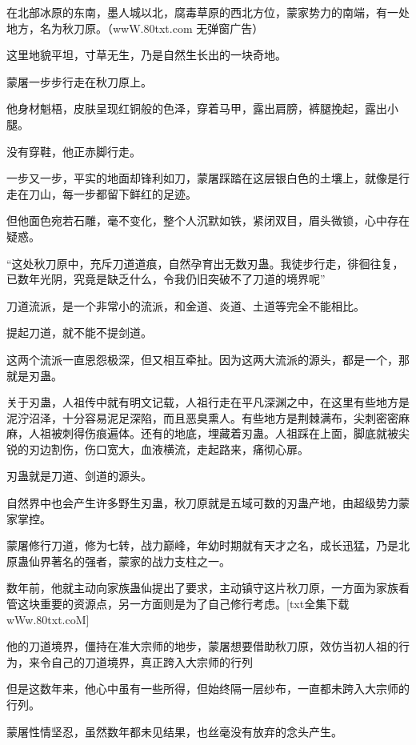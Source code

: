 
\begin{this_body}

在北部冰原的东南，墨人城以北，腐毒草原的西北方位，蒙家势力的南端，有一处地方，名为秋刀原。（wwW.80txt.com 无弹窗广告）

这里地貌平坦，寸草无生，乃是自然生长出的一块奇地。

蒙屠一步步行走在秋刀原上。

他身材魁梧，皮肤呈现红铜般的色泽，穿着马甲，露出肩膀，裤腿挽起，露出小腿。

没有穿鞋，他正赤脚行走。

一步又一步，平实的地面却锋利如刀，蒙屠踩踏在这层银白色的土壤上，就像是行走在刀山，每一步都留下鲜红的足迹。

但他面色宛若石雕，毫不变化，整个人沉默如铁，紧闭双目，眉头微锁，心中存在疑惑。

“这处秋刀原中，充斥刀道道痕，自然孕育出无数刃蛊。我徒步行走，徘徊往复，已数年光阴，究竟是缺乏什么，令我仍旧突破不了刀道的境界呢”

刀道流派，是一个非常小的流派，和金道、炎道、土道等完全不能相比。

提起刀道，就不能不提剑道。

这两个流派一直恩怨极深，但又相互牵扯。因为这两大流派的源头，都是一个，那就是刃蛊。

关于刃蛊，人祖传中就有明文记载，人祖行走在平凡深渊之中，在这里有些地方是泥泞沼泽，十分容易泥足深陷，而且恶臭熏人。有些地方是荆棘满布，尖刺密密麻麻，人祖被刺得伤痕遍体。还有的地底，埋藏着刃蛊。人祖踩在上面，脚底就被尖锐的刃边割伤，伤口宽大，血液横流，走起路来，痛彻心扉。

刃蛊就是刀道、剑道的源头。

自然界中也会产生许多野生刃蛊，秋刀原就是五域可数的刃蛊产地，由超级势力蒙家掌控。

蒙屠修行刀道，修为七转，战力巅峰，年幼时期就有天才之名，成长迅猛，乃是北原蛊仙界著名的强者，蒙家的战力支柱之一。

数年前，他就主动向家族蛊仙提出了要求，主动镇守这片秋刀原，一方面为家族看管这块重要的资源点，另一方面则是为了自己修行考虑。[txt全集下载wWw.80txt.coM]

他的刀道境界，僵持在准大宗师的地步，蒙屠想要借助秋刀原，效仿当初人祖的行为，来令自己的刀道境界，真正跨入大宗师的行列

但是这数年来，他心中虽有一些所得，但始终隔一层纱布，一直都未跨入大宗师的行列。

蒙屠性情坚忍，虽然数年都未见结果，也丝毫没有放弃的念头产生。


\end{this_body}
